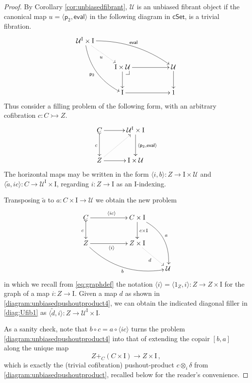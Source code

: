 \documentclass[11pt,reqno]{amsart}
\makeatletter
\newcommand{\cSet}{\ensuremath{\mathsf{cSet}}}
\newcommand{\proj}{\ensuremath{\mathsf{p}}}%
\newcommand{\ra}{\ensuremath{\rightarrow}}
\newcommand{\cof}{\ensuremath{\rightarrowtail}}
\renewcommand{\to}{\ensuremath{\rightarrow}}
\newcommand{\too}{\ensuremath{\longrightarrow}}
\newcommand{\gph}[1]{\ensuremath{\langle #1 \rangle}}
\newcommand{\I}{\ensuremath{\mathrm{I}}}
\newcommand{\U}{\ensuremath{\mathcal{U}}}
\theoremstyle{remark}
\theoremstyle{definition}
\newcommand{\pbcorner}[1][dr]{\save*!/#1-1.2pc/#1:(-1,1)@^{|-}\restore}
\makeatother
\begin{document}
\begin{proof}
By Corollary \ref{cor:unbiasedfibrant}, $\U$ is an unbiased fibrant object if the canonical map $u = \langle \proj_2, \mathsf{eval}\rangle$ in the following diagram in $\cSet$, is a trivial fibration.
\begin{equation}\label{diagram:Uunbiasedfibrant}
\xymatrix{
\U^\I\times \I \ar@/^3ex/ [rrrd]^{\mathsf{eval}} \ar@/_3ex/ [rdd]_{\proj_2} \ar@{..>}[rd]_{u}  && \\
& \I\times \U \pbcorner  \ar[d] \ar[rr] && \U \ar[d] \\
& \I \ar[rr] && 1
}
\end{equation}
%
Thus consider a filling problem of the following form, with an arbitrary cofibration $c:C \cof Z$.
\begin{equation}\label{diag:Ufib1}
\xymatrix@=3em{
C \ar@{>->}[d]_c \ar[r] & \U^\I\times \I \ar[d]^{\langle \proj_2, \mathsf{eval}\rangle} \\
Z  \ar@{..>}[ru] \ar[r]  & \I\times\U  \\
}
\end{equation}
%
The horizontal maps may be written in the form $\langle i, b\rangle : Z \to \I\times \U$ and $\langle \tilde{a} , ic\rangle : C \to \U^\I\times\I$, regarding $i : Z \to \I$ as an $\I$-indexing.

Transposing $\tilde{a}$ to $a : C\times \I \ra \U$ we obtain the new problem
\begin{equation}\label{diagram:unbiasedpushoutproduct4}
\xymatrix{
C \ar@{>->}[d]_{c} \ar[rr]^{\gph{ic}} && C\times \I \ar[d]^{c\times\I} \ar@/^4ex/ [rdd]^{a} \\
Z \ar@/_4ex/ [rrrd]_{b} \ar[rr]_{\gph{i}} &&  Z\times\I  \ar@{.>}[rd]_{d} \\
&&& \U
}
\end{equation}
in which we recall from \eqref{eq:graphdef} the notation $\gph{i} = \gph{1_Z, i} : Z \to Z\times \I$ for the graph of a map $i : Z\to \I$.
Given a map $d$ as shown in \eqref{diagram:unbiasedpushoutproduct4}, we can obtain the indicated diagonal filler in \eqref{diag:Ufib1} as  $\langle \tilde{d} , i\rangle : Z \to \U^\I\times\I$.

As a sanity check, note that $b\circ c = a\circ \langle ic\rangle$ turns the problem \eqref{diagram:unbiasedpushoutproduct4} into that of extending the copair $[b,a]$ along the unique map
\[
Z +_C (C\times \I)\too Z\times \I\,,
\]
which is exactly the (trivial cofibration) pushout-product $c\otimes_i\delta$ from \eqref{diagram:unbiasedpushoutproduct}, recalled below for the reader's convenience.


\end{proof}
\end{document}
